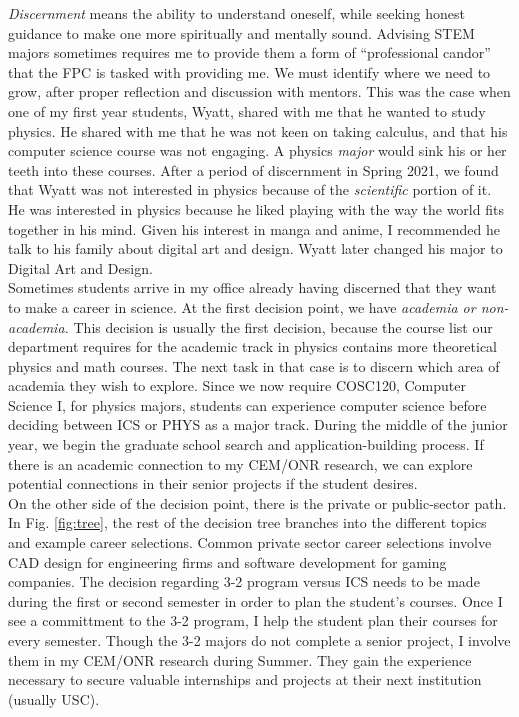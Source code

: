 \documentclass[../../../main.tex]{subfiles}
\begin{document}
\textit{Discernment} means the ability to understand oneself, while seeking honest guidance to make one more spiritually and mentally sound.  Advising STEM majors sometimes requires me to provide them a form of ``professional candor'' that the FPC is tasked with providing me.  We must identify where we need to grow, after proper reflection and discussion with mentors.  This was the case when one of my first year students, Wyatt, shared with me that he wanted to study physics.  He shared with me that he was not keen on taking calculus, and that his computer science course was not engaging.  A physics \textit{major} would sink his or her teeth into these courses.  After a period of discernment in Spring 2021, we found that Wyatt was not interested in physics because of the \textit{scientific} portion of it.  He was interested in physics because he liked playing with the way the world fits together in his mind.  Given his interest in manga and anime, I recommended he talk to his family about digital art and design.  Wyatt later changed his major to Digital Art and Design.
\\
\vspace{0.15cm}
Sometimes students arrive in my office already having discerned that they want to make a career in science.  At the first decision point, we have \textit{academia or non-academia.}  This decision is usually the first decision, because the course list our department requires for the academic track in physics contains more theoretical physics and math courses.  The next task in that case is to discern which area of academia they wish to explore.  Since we now require COSC120, Computer Science I, for physics majors, students can experience computer science before deciding between ICS or PHYS as a major track.  During the middle of the junior year, we begin the graduate school search and application-building process.  If there is an academic connection to my CEM/ONR research, we can explore potential connections in their senior projects if the student desires.
\\
\vspace{0.15cm}
On the other side of the decision point, there is the private or public-sector path.  In Fig. \ref{fig:tree}, the rest of the decision tree branches into the different topics and example career selections.  Common private sector career selections involve CAD design for engineering firms and software development for gaming companies.  The decision regarding 3-2 program versus ICS needs to be made during the first or second semester in order to plan the student's courses.  Once I see a committment to the 3-2 program, I help the student plan their courses for every semester.  Though the 3-2 majors do not complete a senior project, I involve them in my CEM/ONR research during Summer.  They gain the experience necessary to secure valuable internships and projects at their next institution (usually USC).
\end{document}
